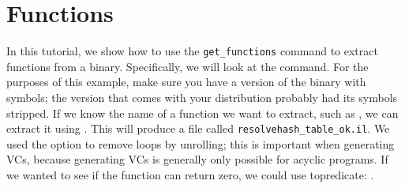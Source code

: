 \section{Functions}

In this tutorial, we show how to use the \texttt{get\_functions}
command to extract functions from a binary.  Specifically, we will
look at the  command.  For the purposes of this
example, make sure you have a version of the binary with symbols; the
version that comes with your distribution probably had its symbols
stripped.  If we know the name of a function we want to extract, such
as , we can extract it using
.  This will
produce a file called \texttt{resolvehash\_table\_ok.il}. We used the
 option to remove loops by unrolling; this is
important when generating VCs, because generating VCs is generally
only possible for acyclic programs. If we wanted to see if the
function can return zero, we could use topredicate:
.

